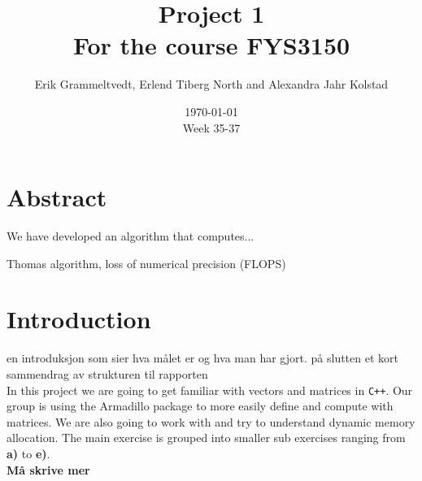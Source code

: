 \documentclass{article}
\begin{document}
\addtocounter{page}{0}

\title{Project 1 \\
      \large For the course FYS3150}
\date{\today \\
    \vspace{1mm}
    \large Week 35-37}

\author{Erik Grammeltvedt, Erlend Tiberg North and Alexandra Jahr Kolstad}

\maketitle

\vspace{1cm}



\section{Abstract}


We have developed an algorithm that computes...

Thomas algorithm, loss of numerical precision (FLOPS)


\vspace{1cm}

\section{Introduction}

en introduksjon som sier hva målet er og hva man har gjort. på slutten et kort sammendrag av strukturen til rapporten \\

In this project we are going to get familiar with vectors and matrices in \texttt{C++}. Our group is using the Armadillo package to more easily define and compute with matrices. We are also going to work with and try to understand dynamic memory allocation. The main exercise is grouped into smaller sub exercises ranging from \textbf{a)} to \textbf{e)}. \\

\textbf{Må skrive mer}


\vspace{1cm}
\end{document}
